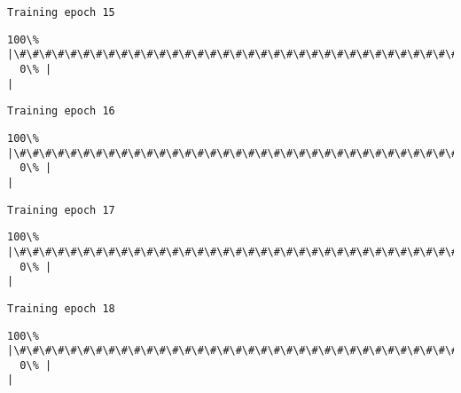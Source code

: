 \documentclass[11pt]{article}
\begin{document}
    \begin{Verbatim}[commandchars=\\\{\}]
Training epoch 15

    \end{Verbatim}

    \begin{Verbatim}[commandchars=\\\{\}]
100\% |\#\#\#\#\#\#\#\#\#\#\#\#\#\#\#\#\#\#\#\#\#\#\#\#\#\#\#\#\#\#\#\#\#\#\#\#\#\#\#\#\#\#\#\#\#\#\#\#\#\#\#\#\#\#\#\#\#\#\#\#\#\#\#\#\#\#\#\#\#\#\#\#|
  0\% |                                                                        |
    \end{Verbatim}

    \begin{Verbatim}[commandchars=\\\{\}]
Training epoch 16

    \end{Verbatim}

    \begin{Verbatim}[commandchars=\\\{\}]
100\% |\#\#\#\#\#\#\#\#\#\#\#\#\#\#\#\#\#\#\#\#\#\#\#\#\#\#\#\#\#\#\#\#\#\#\#\#\#\#\#\#\#\#\#\#\#\#\#\#\#\#\#\#\#\#\#\#\#\#\#\#\#\#\#\#\#\#\#\#\#\#\#\#|
  0\% |                                                                        |
    \end{Verbatim}

    \begin{Verbatim}[commandchars=\\\{\}]
Training epoch 17

    \end{Verbatim}

    \begin{Verbatim}[commandchars=\\\{\}]
100\% |\#\#\#\#\#\#\#\#\#\#\#\#\#\#\#\#\#\#\#\#\#\#\#\#\#\#\#\#\#\#\#\#\#\#\#\#\#\#\#\#\#\#\#\#\#\#\#\#\#\#\#\#\#\#\#\#\#\#\#\#\#\#\#\#\#\#\#\#\#\#\#\#|
  0\% |                                                                        |
    \end{Verbatim}

    \begin{Verbatim}[commandchars=\\\{\}]
Training epoch 18

    \end{Verbatim}

    \begin{Verbatim}[commandchars=\\\{\}]
100\% |\#\#\#\#\#\#\#\#\#\#\#\#\#\#\#\#\#\#\#\#\#\#\#\#\#\#\#\#\#\#\#\#\#\#\#\#\#\#\#\#\#\#\#\#\#\#\#\#\#\#\#\#\#\#\#\#\#\#\#\#\#\#\#\#\#\#\#\#\#\#\#\#|
  0\% |                                                                        |
    \end{Verbatim}
\end{document}
